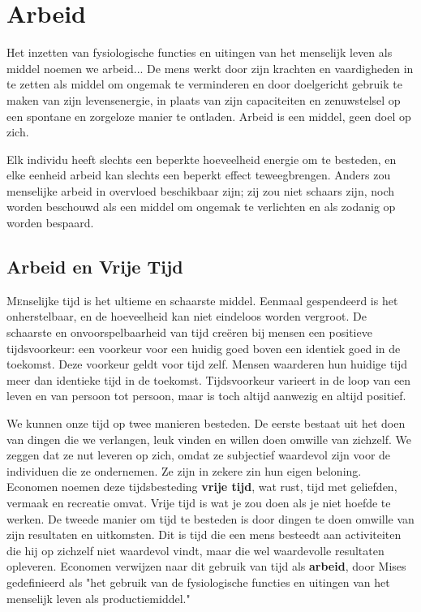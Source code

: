 \hypertarget{arbeid}{%
\chapter{Arbeid}\label{arbeid}}
\begin{blockquotebox}
    Het inzetten van fysiologische functies en uitingen van het menselijk leven als middel noemen we arbeid... De mens werkt door zijn krachten en vaardigheden in te zetten als middel om ongemak te verminderen en door doelgericht gebruik te maken van zijn levensenergie, in plaats van zijn capaciteiten en zenuwstelsel op een spontane en zorgeloze manier te ontladen. Arbeid is een middel, geen doel op zich.

    \noindent Elk individu heeft slechts een beperkte hoeveelheid energie om te besteden, en elke eenheid arbeid kan slechts een beperkt effect teweegbrengen. Anders zou menselijke arbeid in overvloed beschikbaar zijn; zij zou niet schaars zijn, noch worden beschouwd als een middel om ongemak te verlichten en als zodanig op worden bespaard.\footnotemark
\end{blockquotebox}

\section{Arbeid en Vrije Tijd}

\lettrine{M}enselijke tijd is het ultieme en schaarste middel. Eenmaal gespendeerd
is het onherstelbaar, en de hoeveelheid kan niet eindeloos worden
vergroot. De schaarste en onvoorspelbaarheid van tijd creëren bij mensen
een positieve tijdsvoorkeur: een voorkeur voor een huidig goed boven een
identiek goed in de toekomst. Deze voorkeur geldt voor tijd zelf. Mensen
waarderen hun huidige tijd meer dan identieke tijd in de toekomst.
Tijdsvoorkeur varieert in de loop van een leven en van persoon tot
persoon, maar is toch altijd aanwezig en altijd positief.

We kunnen onze tijd op twee manieren besteden. De eerste bestaat uit het
doen van dingen die we verlangen, leuk vinden en willen doen omwille van
zichzelf. We zeggen dat ze nut leveren op zich, omdat ze subjectief
waardevol zijn voor de individuen die ze ondernemen. Ze zijn in zekere
zin hun eigen beloning. Economen noemen deze tijdsbesteding
\textbf{vrije tijd}, wat rust, tijd met geliefden, vermaak en recreatie
omvat. Vrije tijd is wat je zou doen als je niet hoefde te werken. De
tweede manier om tijd te besteden is door dingen te doen omwille van
zijn resultaten en uitkomsten. Dit is tijd die een mens besteedt aan
activiteiten die hij op zichzelf niet waardevol vindt, maar die wel
waardevolle resultaten opleveren. Economen verwijzen naar dit gebruik
van tijd als \textbf{arbeid}, door Mises gedefinieerd als "het gebruik
van de fysiologische functies en uitingen van het menselijk leven als
productiemiddel."\autocite{38}

